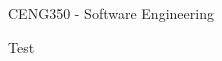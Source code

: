 \documentclass[a4paper]{article}
\begin{document}
\begin{center}
{\Huge{CENG350 - Software Engineering}}
\end{center}
Test
\end{document}

